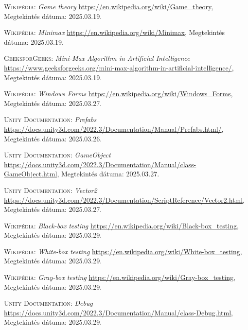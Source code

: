 \documentclass[
]{thesis-ekf}
\theoremstyle{definition}
\theoremstyle{remark}
\begin{document}
\begin{thebibliography}{2}
\textsc{Wikipédia:} \emph{Game theory} 
\url{https://en.wikipedia.org/wiki/Game_theory}, Megtekintés dátuma: 2025.03.19.

\textsc{Wikipédia}: \emph{Minimax} 
\url{https://en.wikipedia.org/wiki/Minimax}, Megtekintés dátuma: 2025.03.19.

\textsc{GeeksforGeeks}: \emph{Mini-Max Algorithm in Artificial Intelligence} 
\url{https://www.geeksforgeeks.org/mini-max-algorithm-in-artificial-intelligence/}, Megtekintés dátuma: 2025.03.19.

\textsc{Wikipédia}: \emph{Windows Forms} 
\url{https://en.wikipedia.org/wiki/Windows_Forms}, Megtekintés dátuma: 2025.03.27.

\textsc{Unity Documentation}: \emph{Prefabs} 
\url{https://docs.unity3d.com/2022.3/Documentation/Manual/Prefabs.html/}, Megtekintés dátuma: 2025.03.26.

\textsc{Unity Documentation}: \emph{GameObject} 
\url{https://docs.unity3d.com/2022.3/Documentation/Manual/class-GameObject.html}, Megtekintés dátuma: 2025.03.27.

\textsc{Unity Documentation}: \emph{Vector2} 
\url{https://docs.unity3d.com/2022.3/Documentation/ScriptReference/Vector2.html}, Megtekintés dátuma: 2025.03.27.

\textsc{Wikipédia}: \emph{Black-box testing} 
\url{https://en.wikipedia.org/wiki/Black-box_testing}, Megtekintés dátuma: 2025.03.29.

\textsc{Wikipédia}: \emph{White-box testing} 
\url{https://en.wikipedia.org/wiki/White-box_testing}, Megtekintés dátuma: 2025.03.29.

\textsc{Wikipédia}: \emph{Gray-box testing} 
\url{https://en.wikipedia.org/wiki/Gray-box_testing}, Megtekintés dátuma: 2025.03.29.

\textsc{Unity Documentation}: \emph{Debug} 
\url{https://docs.unity3d.com/2022.3/Documentation/Manual/class-Debug.html}, Megtekintés dátuma: 2025.03.29.


\end{thebibliography}


\end{document}
